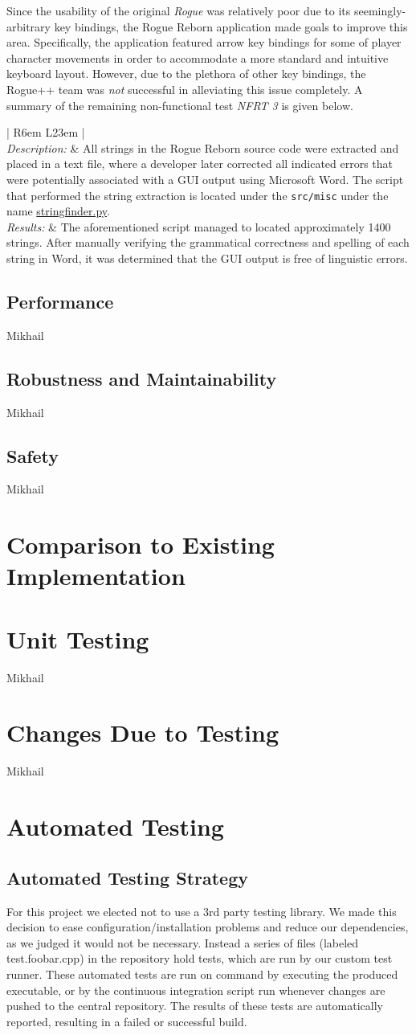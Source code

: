 \documentclass[12pt, titlepage]{article}
\newcommand{\newsection}[1]{
  \newpage
  \section{#1}
}
\newcommand{\nfrt}[1]{
	\textit{NFRT #1}
}
\newcommand{\nfrtc}[3]{
	\begin{center}
		\def\arraystretch{1.6}
		\begin{tabular}{| R{6em} L{23em} |}
			\bottomrule
			\multicolumn{2}{| c |}{\textbf{Non-Functional Requirement Test} \# #1 \textbf{Summary}}  \\
			\hline
			\textit{Description:} & #2 \\
			\textit{Results:} & #3 \\
			\toprule
		\end{tabular}
	\end{center}
}
\begin{document}
		Since the usability of the original \textit{Rogue} was relatively poor due to its seemingly-arbitrary key bindings, the Rogue Reborn application made goals to improve this area.  Specifically, the application featured arrow key bindings for some of player character movements in order to accommodate a more standard and intuitive keyboard layout.  However, due to the plethora of other key bindings, the Rogue++ team was \textit{not} successful in alleviating this issue completely.  A summary of the remaining non-functional test \nfrt{3} is given below.

		\nfrtc{3}
		{All strings in the Rogue Reborn source code were extracted and placed in a text file, where a developer later corrected all indicated errors that were potentially associated with a GUI output using Microsoft Word.  The script that performed the string extraction is located under the \lstinline$src/misc$ under the name \href{run:../../src/misc/stringfinder.py}{stringfinder.py}.}
		{The aforementioned script managed to located approximately 1400 strings.  After manually verifying the grammatical correctness and spelling of each string in Word, it was determined that the GUI output is free of linguistic errors.}

	\subsection{Performance}
		Mikhail

	\subsection{Robustness and Maintainability}
		Mikhail
	
	\subsection{Safety}
		Mikhail

\newsection{Comparison to Existing Implementation} \label{Section_Comparison}

\newsection{Unit Testing} \label{Section_UT}
	Mikhail

\newsection{Changes Due to Testing} \label{Section_Changes}
	Mikhail

\newsection{Automated Testing} \label{Section_Automated}

\subsection{Automated Testing Strategy}
For this project we elected not to use a 3rd party testing library. We made this decision to ease configuration/installation problems and reduce our dependencies, as we judged it would not be necessary. Instead a series of files (labeled test.foobar.cpp) in the repository hold tests, which are run by our custom test runner. These automated tests are run on command by executing the produced executable, or by the continuous integration script run whenever changes are pushed to the central repository. The results of these tests are automatically reported, resulting in a failed or successful build.
\end{document}
